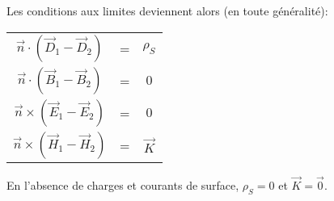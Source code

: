   \begin{marginfigure}[-2cm]
 	\normalsize 
 	\caption{Les conditions aux limites deviennent alors (en toute généralité):}
 	\begin{center}
 		\begin{tabular}{|ccc|}
 			\hline
 			$\vec{n} \cdot (\vec{D}_{1} - \vec{D}_{2}) $ & = & $ \rho_S$ \\
 			$\vec{n} \cdot (\vec{B}_{1} - \vec{B}_{2}) $ & = & $ 0 $ \\
 			$\vec{n} \times (\vec{E}_{1} - \vec{E}_{2}) $ & = & $ 0$ \\
 			$\vec{n} \times (\vec{H}_{1} - \vec{H}_{2}) $ & = & $ \vec{K}$ \\
 			\hline
 		\end{tabular}
 	\end{center}
 	
 	En l'absence de charges et courants de surface, $\rho_S = 0$ et $\vec{K} = \vec{0}.$
 	
 \end{marginfigure}
 
